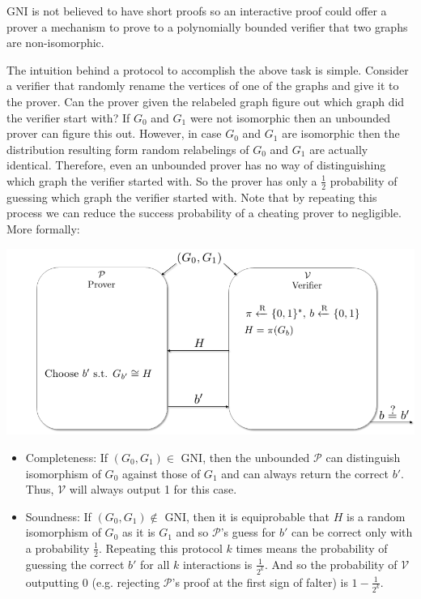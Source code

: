 GNI is not believed to have short proofs so an interactive proof could offer a prover a mechanism to prove to a polynomially bounded verifier that two graphs are non-isomorphic. 


The intuition behind a protocol to accomplish the above task is simple. Consider a verifier that randomly rename the vertices of one of the graphs and give it to the prover. Can the prover given the relabeled graph figure out which graph did the verifier start with?  If $G_0$ and $G_1$ were not isomorphic  then an unbounded prover can figure this out. However, in case $G_0$ and $G_1$ {are} isomorphic then the distribution resulting form random relabelings of $G_0$ and $G_1$ are actually identical. Therefore, even an unbounded prover has no way of distinguishing which graph the verifier started with. So the prover has only a $\frac12$ probability of guessing which graph the verifier started with. Note that by repeating this process we can reduce the success probability of a cheating prover to negligible. More formally:


		\begin{center}
			\includegraphics[scale=.51094]{Old Scribe Notes/GNI_IP_Protocol.png}
		\end{center}

		\begin{itemize}
			\item Completeness: If $(G_0,G_1)\in$ GNI, then the unbounded $\mathcal{P}$ can distinguish isomorphism of $G_0$ against those of $G_1$ and can always return the correct $b'$.  Thus, $\mathcal{V}$ will always output 1 for this case.
			\item Soundness: If $(G_0,G_1)\notin$ GNI, then it is equiprobable that $H$ is a random isomorphism of $G_0$ as it is $G_1$ and so $\mathcal{P}$'s guess for $b'$ can be correct only with a probability $\frac{1}{2}$.  Repeating this protocol $k$ times means the probability of guessing the correct $b'$ for all $k$ interactions is $\frac{1}{2^k}$.  And so the probability of $\mathcal{V}$ outputting 0 (e.g. rejecting $\mathcal{P}$'s proof at the first sign of falter) is $1-\frac{1}{2^k}$. 
		\end{itemize}

